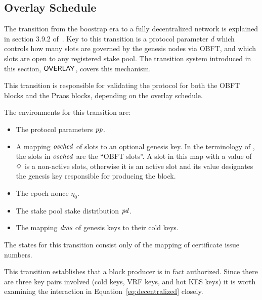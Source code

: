 \clearpage

\subsection{Overlay Schedule}
\label{sec:overlay-schedule}

The transition from the boostrap era to a fully decentralized network is explained in
section 3.9.2 of~\cite{delegation_design}.
Key to this transition is a protocol parameter $d$ which controls how many slots are governed by
the genesis nodes via OBFT, and which slots are open to any registered stake pool.
The transition system introduced in this section, $\mathsf{OVERLAY}$, covers this mechanism.

This transition is responsible for validating the protocol for both the OBFT blocks
and the Praos blocks, depending on the overlay schedule.

The environments for this transition are:
\begin{itemize}
  \item The protocol parameters $\mathit{pp}$.
  \item A mapping $\mathit{osched}$ of slots to an optional genesis key.
    In the terminology of \cite{delegation_design},
    the slots in $\mathit{osched}$ are the ``OBFT slots''.
    A slot in this map with a value of $\Diamond$ is a non-active slots,
    otherwise it is an active slot and its value designates the genesis key
    responsible for producing the block.
  \item The epoch nonce $\eta_0$.
  \item The stake pool stake distribution $\mathit{pd}$.
  \item The mapping $\mathit{dms}$ of genesis keys to their cold keys.
\end{itemize}

The states for this transition consist only of the mapping of certificate issue numbers.

This transition establishes that a block producer is in fact authorized.
Since there are three key pairs involved (cold keys, VRF keys, and hot KES keys)
it is worth examining the interaction in Equation~\ref{eq:decentralized} closely.

